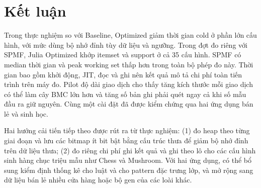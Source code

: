 \documentclass[conference]{IEEEtran}
\begin{document}




\section{Kết luận}\label{sec:conclusion}
Trong thực nghiệm so với Baseline, Optimized giảm thời gian cold ở phần lớn cấu hình, với mức dùng bộ nhớ đỉnh tùy dữ liệu và ngưỡng. Trong đợt đo riêng với SPMF, Julia Optimized khớp itemset và support ở cả 35 cấu hình. SPMF có median thời gian và peak working set thấp hơn trong toàn bộ phép đo này. Thời gian bao gồm khởi động, JIT, đọc và ghi nên kết quả mô tả chi phí toàn tiến trình trên máy đo. Pilot độ dài giao dịch cho thấy tăng kích thước mỗi giao dịch có thể làm cây BMC lớn hơn và tăng số bản ghi phải quét ngay cả khi số mẫu đầu ra giữ nguyên. Cùng một cài đặt đã được kiểm chứng qua hai ứng dụng bán lẻ và sinh học.

Hai hướng cải tiến tiếp theo được rút ra từ thực nghiệm: (1) đo heap theo từng giai đoạn và lưu các bitmap ít bit bật bằng cấu trúc thưa để giảm bộ nhớ đỉnh trên dữ liệu thưa; (2) đo riêng chi phí ghi kết quả và ghi theo lô cho các cấu hình sinh hàng chục triệu mẫu như Chess và Mushroom. Với hai ứng dụng, có thể bổ sung kiểm định thống kê cho luật và cho pattern đặc trưng lớp, và mở rộng sang dữ liệu bán lẻ nhiều cửa hàng hoặc bộ gen của các loài khác.



\end{document}
